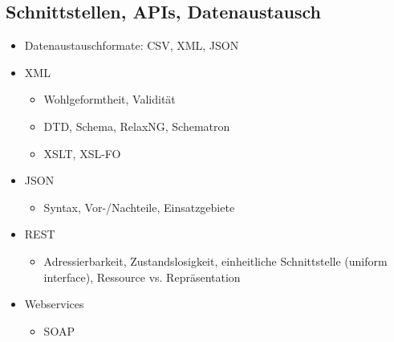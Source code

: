 \subsection{Schnittstellen, APIs, Datenaustausch}
\label{sec:Schnittstellen}

\begin{itemize}
	\item Datenaustauschformate: CSV, XML, JSON
	\item XML
	\begin{itemize}
		\item Wohlgeformtheit, Validität
		\item DTD, Schema, RelaxNG, Schematron
		\item XSLT, XSL-FO
	\end{itemize}
	\item JSON
	\begin{itemize}
		\item Syntax, Vor-/Nachteile, Einsatzgebiete
	\end{itemize}
	\item REST
	\begin{itemize}
		\item Adressierbarkeit, Zustandslosigkeit, einheitliche Schnittstelle (uniform interface), Ressource vs. Repräsentation
	\end{itemize}
	\item Webservices
	\begin{itemize}
		\item SOAP
	\end{itemize}
\end{itemize}